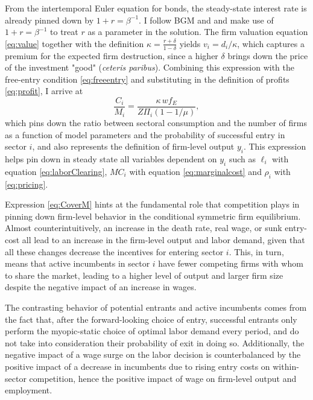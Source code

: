 \documentclass[a4paper,12pt]{article} %
\numberwithin{equation}{section} %
\numberwithin{figure}{section}
\numberwithin{table}{section}
\begin{document}
From the intertemporal Euler equation for bonds, the steady-state interest rate is already pinned down by $1+r = \beta^{-1}$. I follow 
BGM and \textcite{campbell1994inspecting} and make use of $1+r = \beta^{-1}$ to treat $r$ as a parameter in the solution. The firm valuation
equation \eqref{eq:value} together with the definition $\kappa=\frac{r+\delta}{1-\delta}$ yields $v_i = d_i/\kappa$, which captures a premium for
the expected firm destruction, since a higher $\delta$ brings down the price of the investment "good" (\textit{ceteris paribus}). Combining 
this expression with the free-entry condition \eqref{eq:freeentry} and substituting in the definition of profits \eqref{eq:profit}, I arrive at  
\begin{equation}
  \frac{C_i}{M_i}=\frac{\kappa\,w f_E}{Z\Pi_i(1-1/\mu)}, \label{eq:CoverM}
\end{equation}
which pins down the ratio between sectoral consumption and the number of firms as a function of model parameters and the probability of successful 
entry in sector $i$, and also represents the definition of firm-level output $y_i$. This expression helps pin down in steady state all 
variables dependent on $y_i$ such as $\ell_i$ with equation \eqref{eq:laborClearing}, $MC_i$ with equation \eqref{eq:marginalcost} and 
$\rho_i$ with \eqref{eq:pricing}. 

Expression \eqref{eq:CoverM} hints at the fundamental role that competition plays in pinning down firm-level
behavior in the conditional symmetric firm equilibrium. Almost counterintuitively, an increase in the death rate, real wage, or sunk entry-cost all lead
to an increase in the firm-level output and labor demand, given that all these changes decrease the incentives for entering sector $i$. This, in turn,
means that active incumbents in sector $i$ have fewer competing firms with whom to share the market, leading to a higher level of output and larger
firm size despite the negative impact of an increase in wages. 

The contrasting behavior of potential entrants and active incumbents comes from the fact that, after the forward-looking choice of entry, 
successful entrants only perform the myopic-static choice of optimal labor demand every period, and do not take into consideration their probability
of exit in doing so. Additionally, the negative impact of a wage surge on the labor decision is counterbalanced by the 
positive impact of a decrease in incumbents due to rising entry costs on within-sector competition, hence the positive impact of wage on firm-level output 
and employment.
\end{document}
